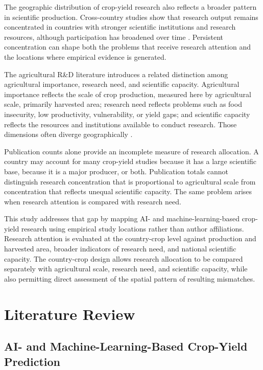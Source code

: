 \documentclass[ASNA,twocolumn]{USG}
\begin{document}
The geographic distribution of crop-yield research also reflects a broader pattern in
scientific production. Cross-country studies show that research output remains concentrated
in countries with stronger scientific institutions and research resources, although
participation has broadened over time \cite{Bueno2025,CashGibson2018}. Persistent
concentration can shape both the problems that receive research attention and the locations
where empirical evidence is generated.

The agricultural R\&D literature introduces a related distinction among agricultural importance,
research need, and scientific capacity. Agricultural importance reflects the scale of crop
production, measured here by agricultural scale, primarily harvested area; research need reflects problems such as food insecurity, low productivity,
vulnerability, or yield gaps; and scientific capacity reflects the resources and institutions
available to conduct research. Those dimensions often diverge geographically
\cite{NinPratt2021,NinPratt2023,Rosegrant2023,vanDijk2025}.

Publication counts alone provide an incomplete measure of research allocation. A
country may account for many crop-yield studies because it has a large scientific base,
because it is a major producer, or both. Publication totals cannot distinguish research
concentration that is proportional to agricultural scale from concentration that
reflects unequal scientific capacity. The same problem arises when research attention is
compared with research need.

This study addresses that gap by mapping AI- and machine-learning-based crop-yield research
using empirical study locations rather than author affiliations. Research attention is
evaluated at the country-crop level against production and harvested area, broader indicators
of research need, and national scientific capacity. The country-crop design allows research
allocation to be compared separately with agricultural scale, research need, and
scientific capacity, while also permitting direct assessment of the spatial pattern of
resulting mismatches.

\section{Literature Review}

\subsection{AI- and Machine-Learning-Based Crop-Yield Prediction}
\end{document}
